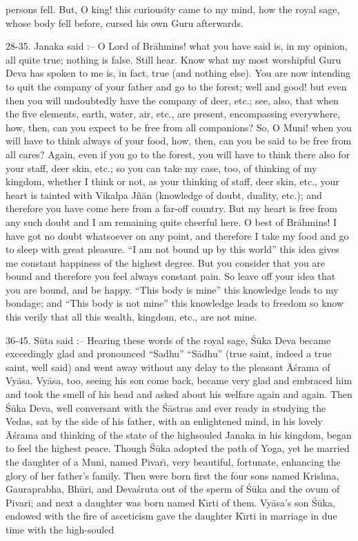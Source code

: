 persons fell. But, O king! this curiousity came to my mind, how the royal sage, whose body fell before, cursed his own Guru afterwards.

28-35. Janaka said :-- O Lord of Br\=ahmins! what you have said is, in my opinion, all quite true; nothing is false. Still hear. Know what my most worshipful Guru Deva has spoken to me is, in fact, true (and nothing else). You are now intending to quit the company of your father and go to the forest; well and good! but even then you will undoubtedly have the company of deer, etc.; see, also, that when the five elements, earth, water, air, etc., are present, encompassing everywhere, how, then, can you expect to be free from all companions? So, O Muni! when you will have to think always of your food, how, then, can you be said to be free from all cares? Again, even if you go to the forest, you will have to think there also for your staff, deer skin, etc.; so you can take my case, too, of thinking of my kingdom, whether I think or not, as your thinking of staff, deer skin, etc., your heart is tainted with Vikalpa J\~n\=an (knowledge of doubt, duality, etc.); and therefore you have come here from a far-off country. But my heart is free from any such doubt and I am remaining quite cheerful here. O best of Br\=ahmins! I have got no doubt whatsoever on any point, and therefore I take my food and go to sleep with great pleasure. ``I am not bound up by this world'' this idea gives me constant happiness of the highest degree. But you consider that you are bound and therefore you feel always constant pain. So leave off your idea that you are bound, and be happy. ``This body is mine'' this knowledge leads to my bondage; and ``This body is not mine'' this knowledge leads to freedom so know this verily that all this wealth, kingdom, etc., are not mine.

36-45. S\=uta said :-- Hearing these words of the royal sage, \'S\=uka Deva became exceedingly glad and pronounced ``Sadhu'' ``S\=adhu'' (true saint, indeed a true saint, well said) and went away without any delay to the pleasant \=A\'srama of Vy\=asa. Vy\=asa, too, seeing his son come back, became very glad and embraced him and took the smell of his head and asked about his welfare again and again. Then \'S\=uka Deva, well conversant with the \'S\=astras and ever ready in studying the Vedas, sat by the side of his father, with an enlightened mind, in his lovely \=A\'srama and thinking of the state of the highsouled Janaka in his kingdom, began to feel the highest peace. Though \'S\=uka adopted the path of Yoga, yet he married the daughter of a Muni, named Pivar\={\i}, very beautiful, fortunate, enhancing the glory of her father's family. Then were born first the four sons named Krishna, Gauraprabha, Bh\=uri, and Deva\'sruta out of the sperm of \'S\=uka and the ovum of Pivari; and next a daughter was born named K\={\i}rti of them. Vy\=asa's son \'S\=uka, endowed with the fire of asceticism gave the daughter K\={\i}rti in marriage in due time with the high-souled

